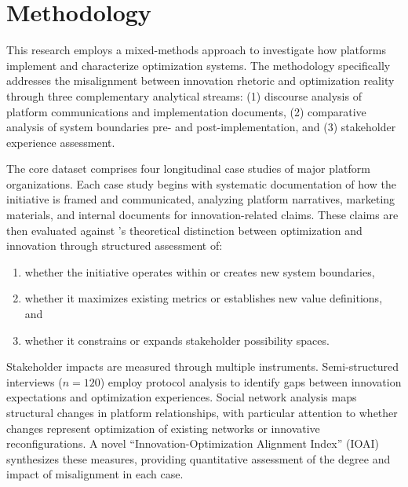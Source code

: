 \section{Methodology}

This research employs a mixed-methods approach \parencite{creswell2017} to investigate how platforms implement and characterize optimization systems. The methodology specifically addresses the misalignment between innovation rhetoric and optimization reality through three complementary analytical streams: (1) discourse analysis of platform communications and implementation documents, (2) comparative analysis of system boundaries pre- and post-implementation, and (3) stakeholder experience assessment.

The core dataset comprises four longitudinal case studies of major platform organizations. Each case study begins with systematic documentation of how the initiative is framed and communicated, analyzing platform narratives, marketing materials, and internal documents for innovation-related claims. These claims are then evaluated against \textcite{march1991}'s theoretical distinction between optimization and innovation through structured assessment of:
\begin{enumerate}[label=(\alph*)]
    \item whether the initiative operates within or creates new system boundaries,
    \item whether it maximizes existing metrics or establishes new value definitions, and
    \item whether it constrains or expands stakeholder possibility spaces.
\end{enumerate}

Stakeholder impacts are measured through multiple instruments. Semi-structured interviews ($n=120$) employ protocol analysis to identify gaps between innovation expectations and optimization experiences. Social network analysis maps structural changes in platform relationships, with particular attention to whether changes represent optimization of existing networks or innovative reconfigurations. A novel ``Innovation-Optimization Alignment Index'' (IOAI) synthesizes these measures, providing quantitative assessment of the degree and impact of misalignment in each case. 